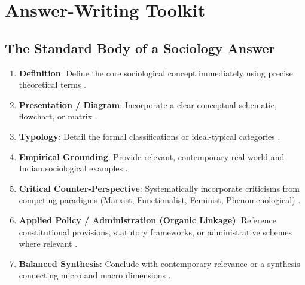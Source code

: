\sectiondivider


\section{Answer-Writing Toolkit}

\subsection{The Standard Body of a Sociology Answer}
\begin{enumerate}
    \item \textbf{Definition}: Define the core sociological concept immediately using precise theoretical terms .
    \item \textbf{Presentation / Diagram}: Incorporate a clear conceptual schematic, flowchart, or matrix .
    \item \textbf{Typology}: Detail the formal classifications or ideal-typical categories .
    \item \textbf{Empirical Grounding}: Provide relevant, contemporary real-world and Indian sociological examples .
    \item \textbf{Critical Counter-Perspective}: Systematically incorporate criticisms from competing paradigms (Marxist, Functionalist, Feminist, Phenomenological) .
    \item \textbf{Applied Policy / Administration (Organic Linkage)}: Reference constitutional provisions, statutory frameworks, or administrative schemes where relevant .
    \item \textbf{Balanced Synthesis}: Conclude with contemporary relevance or a synthesis connecting micro and macro dimensions .
\end{enumerate}

